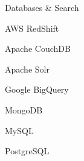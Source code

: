 \begin{skillset}{Databases \& Search}
  \item AWS RedShift
  \item Apache CouchDB
  \item Apache Solr
  \item Google BigQuery
  \item MongoDB
  \item MySQL
  \item PostgreSQL
\end{skillset}
